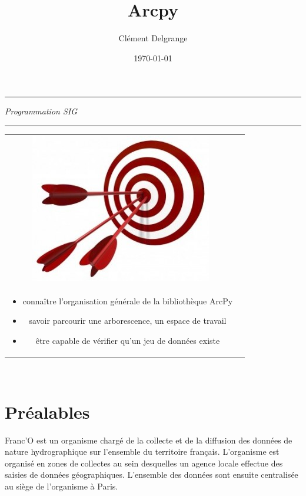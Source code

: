 \documentclass[11pt]{article}
\title{Arcpy}
\author{Clément Delgrange}
\date{\today}
\newenvironment{objectifs}{
	\begin{lrbox}{\mybox}
		\begin{minipage}{0.9\textwidth}
			\vspace{1em}
			\begin{tabular}[t t]{c c}
				\includegraphics[width=0.1\linewidth]{img/goals.jpg} &
				\begin{minipage}[c]{0.8\linewidth}
					\hspace{2em}\textbf{\large{Objectifs :}} \\
}{
				\end{minipage}
			\end{tabular}
			\vspace{1em}
		\end{minipage}
	\end{lrbox}
	\fbox{\usebox{\mybox}}
}
\begin{document}
\parindent=0cm


\begin{titlepage}
\makeatletter
	\begin{sffamily}
		\begin{flushleft}
		\end{flushleft}
		\begin{flushright}
		\end{flushright}

		\vspace{4cm}

		\begin{center}
			\hrule
				\vspace{1em}
				{\small \textit{Programmation SIG}}\\
				\vspace{0.5cm}
				{\huge\bfseries \@title}
				\vspace{1cm}
			\hrule

			\vspace{4cm}
			\begin{objectifs}
				\begin{itemize}
					\item connaître l'organisation générale de la bibliothèque ArcPy
					\item savoir parcourir une arborescence, un espace de travail
					\item être capable de vérifier qu'un jeu de données existe
				\end{itemize}
			\end{objectifs}
			\vspace{3cm}
			
			\large \textit{\@author}\\
			\small \textit{\@date}
		\end{center}
	\end{sffamily}
\makeatother
\end{titlepage}



\section*{Préalables}
Franc'O est un organisme chargé de la collecte et de la diffusion des données de nature hydrographique sur l'ensemble du territoire français. L'organisme est organisé en zones de collectes au sein desquelles un agence locale effectue des saisies de données géographiques. L'ensemble des données sont ensuite centralisée au siège de l'organisme à Paris.
\end{document}
